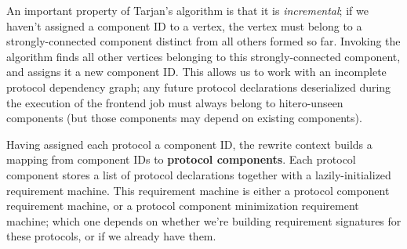 \documentclass[../generics]{subfiles}
\begin{document}
%
An important property of Tarjan's algorithm is that it is \emph{incremental}; if we haven't assigned a component ID to a vertex, the vertex must belong to a strongly-connected component distinct from all others formed so far. Invoking the algorithm finds all other vertices belonging to this strongly-connected component, and assigns it a new component ID. This allows us to work with an incomplete protocol dependency graph; any future protocol declarations deserialized during the execution of the frontend job must always belong to hitero-unseen components (but those components may depend on existing components).

Having assigned each protocol a component ID, the rewrite context builds a mapping from component IDs to \textbf{protocol components}. Each protocol component stores a list of protocol declarations together with a lazily-initialized requirement machine. This requirement machine is either a protocol component requirement machine, or a protocol component minimization requirement machine; which one depends on whether we're building requirement signatures for these protocols, or if we already have them.
\end{document}
